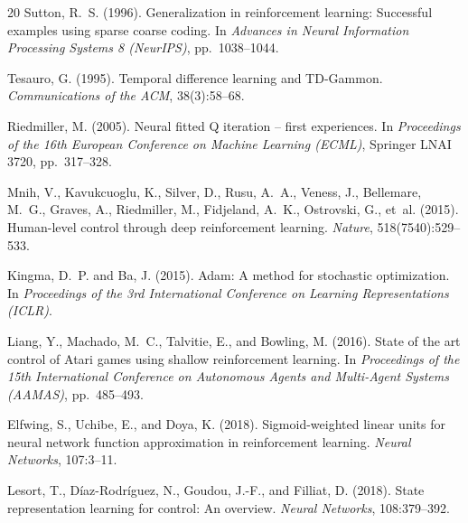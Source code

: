 \documentclass[11pt]{article}
\begin{document}
\begin{thebibliography}{20}
Sutton, R.~S. (1996).
\newblock Generalization in reinforcement learning: Successful examples using sparse coarse coding.
\newblock In \emph{Advances in Neural Information Processing Systems 8 (NeurIPS)}, pp.\ 1038--1044.


Tesauro, G. (1995).
\newblock Temporal difference learning and TD-Gammon.
\newblock \emph{Communications of the ACM}, 38(3):58--68.

Riedmiller, M. (2005).
\newblock Neural fitted Q iteration -- first experiences.
\newblock In \emph{Proceedings of the 16th European Conference on Machine Learning (ECML)}, Springer LNAI 3720, pp.\ 317--328.

Mnih, V., Kavukcuoglu, K., Silver, D., Rusu, A.~A., Veness, J., Bellemare, M.~G., Graves, A., Riedmiller, M., Fidjeland, A.~K., Ostrovski, G., et~al. (2015).
\newblock Human-level control through deep reinforcement learning.
\newblock \emph{Nature}, 518(7540):529--533.

Kingma, D.~P. and Ba, J. (2015).
\newblock Adam: A method for stochastic optimization.
\newblock In \emph{Proceedings of the 3rd International Conference on Learning Representations (ICLR)}.


Liang, Y., Machado, M.~C., Talvitie, E., and Bowling, M. (2016).
\newblock State of the art control of Atari games using shallow reinforcement learning.
\newblock In \emph{Proceedings of the 15th International Conference on Autonomous Agents and Multi-Agent Systems (AAMAS)}, pp.\ 485--493.

Elfwing, S., Uchibe, E., and Doya, K. (2018).
\newblock Sigmoid-weighted linear units for neural network function approximation in reinforcement learning.
\newblock \emph{Neural Networks}, 107:3--11.

Lesort, T., D\'{i}az-Rodr\'{i}guez, N., Goudou, J.-F., and Filliat, D. (2018).
\newblock State representation learning for control: An overview.
\newblock \emph{Neural Networks}, 108:379--392.


\end{thebibliography}
\end{document}
